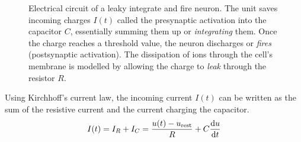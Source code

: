 \begin{figure}[H]
    \centering
{}
\caption[Electrical circuit of a leaky integrate and fire neuron]{Electrical circuit of a leaky integrate and fire neuron. The unit saves incoming charges $I(t)$ called the presynaptic activation into the capacitor $C$, essentially summing them up or \emph{integrating} them. Once the charge reaches a threshold value, the neuron discharges or \emph{fires} (postsynaptic activation). The dissipation of ions through the cell's membrane is modelled by allowing the charge to \emph{leak} through the resistor $R$.}\label{fig:LIF}
\end{figure}\noindent
Using Kirchhoff's current law, the incoming current $I(t)$ can be written as the sum of the resistive current and the current charging the capacitor.
\begin{align}
    I(t) = I_R + I_C =  \frac{u(t) - u_\mathrm{rest}}{R}+C\dv{u}{t}
\end{align}
